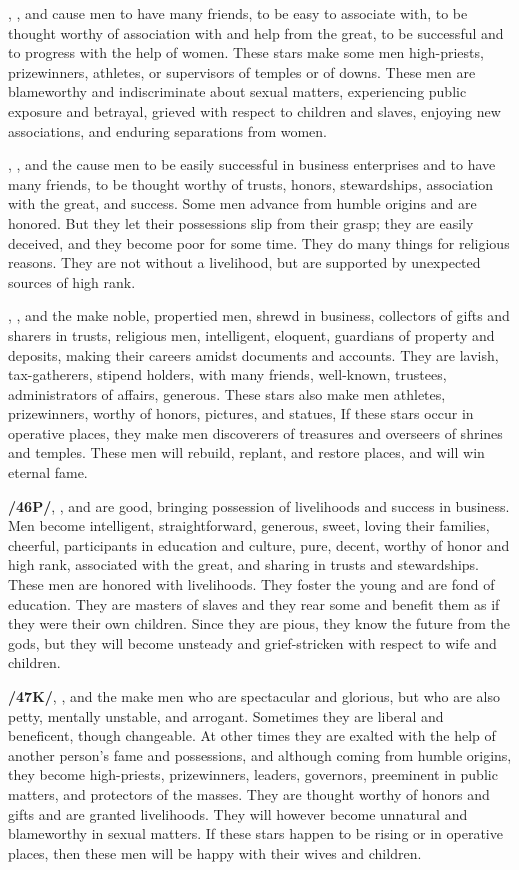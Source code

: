\Jupiter, \Mars, and \Venus\xspace cause men to have many friends, to be easy to associate with, to be thought worthy of association with and help from the great, to be successful and to progress with the help of women. These stars make some men high-priests, prizewinners, athletes, or supervisors of temples or of downs. These men are blameworthy and indiscriminate about sexual matters, experiencing public exposure and betrayal, grieved with respect to children and slaves, enjoying new associations, and enduring separations from women.

\Jupiter, \Mercury, and the \Sun\xspace cause men to be easily successful in business enterprises and to have many friends, to be thought worthy of trusts, honors, stewardships, association with the great, and success. Some men advance from humble origins and are honored. But they let their possessions slip from their grasp; they are easily deceived, and they become poor for some time. They do many things for religious
reasons. They are not without a livelihood, but are supported by unexpected sources of high rank.

\Jupiter, \Mercury, and the \Moon\xspace make noble, propertied men, shrewd in business, collectors of gifts
and sharers in trusts, religious men, intelligent, eloquent, guardians of property and deposits, making their careers amidst documents and accounts. They are lavish, tax-gatherers, stipend holders, with many friends, well-known, trustees, administrators of affairs, generous. These stars also make men athletes, prizewinners, worthy of honors, pictures, and statues, If these stars occur in operative places, they make men discoverers of treasures and overseers of shrines and temples. These men will rebuild, replant, and restore places, and will win eternal fame.

\textbf{/46P/}\Jupiter, \Mercury, and \Venus\xspace are good, bringing possession of livelihoods and success in business. Men become intelligent, straightforward, generous, sweet, loving their families, cheerful, participants in education and culture, pure, decent, worthy of honor and high rank, associated with the great, and sharing in trusts and stewardships. These men are honored with livelihoods. They foster the young and are fond of education. They are masters of slaves and they rear some and benefit them as if they
were their own children. Since they are pious, they know the future from the gods, but they will become unsteady and grief-stricken with respect to wife and children.

\textbf{/47K/}\Jupiter, \Venus, and the \Sun\xspace make men who are spectacular and glorious, but who are also petty,
mentally unstable, and arrogant. Sometimes they are liberal and beneficent, though changeable. At other times they are exalted with the help of another person’s fame and possessions, and although coming from humble origins, they become high-priests, prizewinners, leaders, governors, preeminent in public matters, and protectors of the masses. They are thought worthy of honors and gifts and are granted livelihoods. They will however become unnatural and blameworthy in sexual matters. If these stars happen to be rising or in operative places, then these men will be happy with their wives and children.

